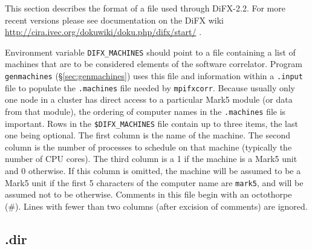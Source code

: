 This section describes the format of a file used through DiFX-2.2.
For more recent versions please see documentation on the DiFX wiki \url{http://cira.ivec.org/dokuwiki/doku.php/difx/start/} .

Environment variable {\tt DIFX\_MACHINES} should point to a file containing a list of machines that are to be considered elements of the software correlator.
Program {\tt genmachines} (\S\ref{sec:genmachines}) uses this file and information within a {\tt .input} file to populate the {\tt .machines} file needed by {\tt mpifxcorr}.
Because usually only one node in a cluster has direct access to a particular Mark5 module (or data from that module), the ordering of computer names in the {\tt .machines} file is important.
Rows in the {\tt \$DIFX\_MACHINES} file contain up to three items, the last one being optional.
The first column is the name of the machine.
The second column is the number of processes to schedule on that machine (typically the number of CPU cores).
The third column is a 1 if the machine is a Mark5 unit and 0 otherwise.
If this column is omitted, the machine will be assumed to be a Mark5 unit if the first 5 characters of the computer name are {\tt mark5}, and will be assumed not to be otherwise.
Comments in this file begin with an octothorpe (\#).
Lines with fewer than two columns (after excision of comments) are ignored.








\subsection{.dir} \label{sec:dir}

